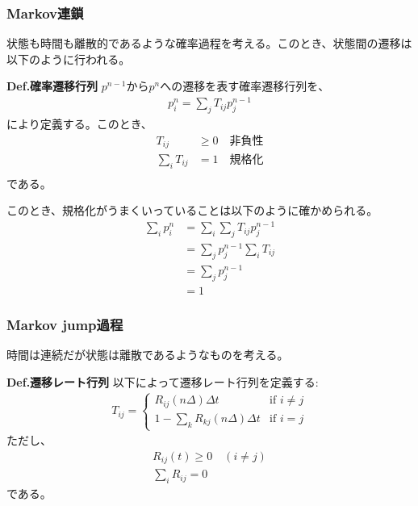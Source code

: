 \documentclass[a4paper,11pt]{jsarticle}
\numberwithin{equation}{section}
\begin{document}
\subsubsection{Markov連鎖}
状態も時間も離散的であるような確率過程を考える。このとき、状態間の遷移は以下のように行われる。
\begin{itembox}[l]{\textbf{Def.確率遷移行列}}
  $p^{n-1}$から$p^{n}$への遷移を表す確率遷移行列を、
  \begin{align}
    p^{n}_i = \sum_{j}T_{ij}p^{n-1}_j
  \end{align}
  により定義する。このとき、
  \begin{align}
    T_{ij} &\geq 0 \quad \text{非負性}\\
    \sum_{i}T_{ij} &= 1 \quad \text{規格化}\\
  \end{align}
  である。
\end{itembox}
このとき、規格化がうまくいっていることは以下のように確かめられる。\\
\begin{align}
  \sum_{i}p^{n}_i &= \sum_{i}\sum_{j}T_{ij}p^{n-1}_j\\
  &= \sum_{j}p^{n-1}_j\sum_{i}T_{ij}\\
  &= \sum_{j}p^{n-1}_j\\
  &= 1
\end{align}

\subsubsection{Markov jump過程}
時間は連続だが状態は離散であるようなものを考える。\\
\begin{itembox}[l]{\textbf{Def.遷移レート行列}}
  以下によって遷移レート行列を定義する:
  \begin{align}
    T_{ij} = \begin{cases}
      R_{ij}(n\Delta) \Delta t & \text{if $i \neq j$}\\
      1-\sum_{k}R_{kj}(n\Delta) \Delta t & \text{if $i = j$}
    \end{cases}
  \end{align}
  ただし、
  \begin{align}
    R_{ij}(t) \geq 0 \quad (i \neq j)\\
    \sum_{i}R_{ij} = 0
  \end{align}
  である。
\end{itembox}
\end{document}

